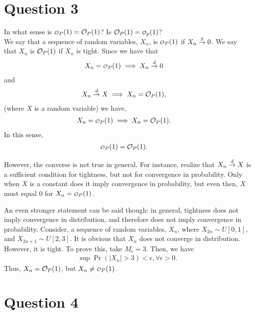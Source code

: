 \documentclass[12pt]{paper}
\begin{document}
\section*{Question 3}
In what sense is $\smallO_P(1)=\bigO_P(1)$? Is $\bigO_P(1)=\smallO_p(1)$?
\\

We say that a sequence of random variables, $X_n$, is $\smallO_P(1)$ if $X_n \overset{p}{\to} 0$. We say that $X_n$ is $\mathcal{O}_P(1)$ if $X_n$ is tight. Since we have that 
\begin{align*}
X_n=\smallO_P(1) &\implies X_n \convDist 0
\end{align*}
and
\begin{align*}
X_n \overset{d}{\to} X &\implies X_n=\mathcal{O}_P(1),
\end{align*}
(where $X$ is a random variable) we have,
\begin{align*}
X_n=\smallO_P(1) &\implies X_n=\bigO_P(1).
\end{align*}
In this sense,
\begin{align*}
\smallO_P(1)&=\bigO_P(1).
\end{align*}

However, the converse is not true in general. For instance, realize that $X_n \overset{d}{\to} X$ is a sufficient condition for tightness, but not for convergence in probability. Only when $X$ is a constant does it imply convergence in probability, but even then, $X$ must equal $0$ for $X_n=\smallO_P(1)$.

An even stronger statement can be said though: in general, tightness does not imply convergence in distribution, and therefore does not imply convergence in probability. Consider, a sequence of random variables, $X_n$, where $X_{2n} \sim U[0,1]$, and $X_{2n+1} \sim U[2,3]$. It is obvious that $X_n$ does not converge in distribution. However, it is tight. To prove this, take $M_\epsilon=3$. Then, we have
\begin{align*}
\sup \Pr (|X_n|> 3)< \epsilon, \forall \epsilon >0.
\end{align*}
Thus, $X_n=\mathcal{O}_P(1)$, but $X_n \ne \smallO_P(1)$.

\section*{Question 4}
\end{document}
